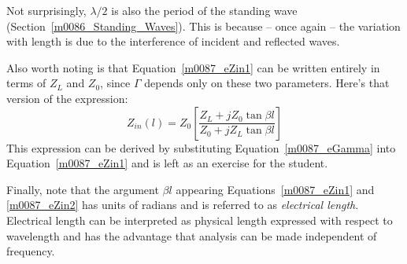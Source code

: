 Not surprisingly, $\lambda/2$ is also the period of the standing wave (Section~\ref{m0086_Standing_Waves}).
This is because -- once again -- the variation with length is due to the interference of incident and reflected waves.

Also worth noting is that Equation~\ref{m0087_eZin1} can be written entirely in terms of $Z_L$ and $Z_0$, since $\Gamma$ depends only on these two parameters.  
Here's that version of the expression:
%
\begin{equation}
Z_{in}(l) = Z_0 \left[ \frac{ Z_L + jZ_0\tan\beta l }{ Z_0 + jZ_L\tan\beta l } \right]
\label{m0087_eZin2}
\end{equation}
%
This expression can be derived by substituting Equation~\ref{m0087_eGamma} into Equation~\ref{m0087_eZin1} and is left as an exercise for the student.
%

Finally, note that the argument $\beta l$ appearing Equations~\ref{m0087_eZin1} and \ref{m0087_eZin2} has units of radians and is referred to as \emph{electrical length}.
Electrical length can be interpreted as physical length expressed with respect to wavelength and has the advantage that analysis can be made independent of frequency.  

